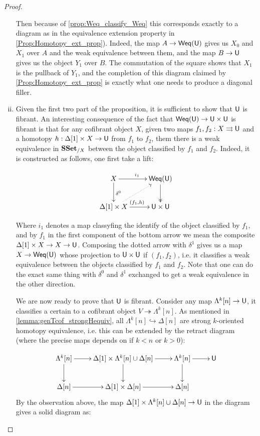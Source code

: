 \documentclass[reqno,10pt,a4paper,oneside,draft]{amsart}
\begin{document}
\begin{proof}
\begin{enumerate}[(i)]
Then because of  \cref{prop:Weq_classify_Weq} this corresponds exactly to a diagram as in the equivalence extension property in \cref{Prop:Homotopy_ext_prop}). Indeed, the map $A \rightarrow  \mathsf{Weq}(\mathsf{U})$ gives us $X_0$ and $X_1$ over $A$ and the weak equivalence between them, and the map $B \rightarrow \mathsf{U}$ gives us the object $Y_1$ over $B$. The commutation of the square shows that $X_1$ is the pullback of $Y_1$, and the completion of this diagram claimed by \cref{Prop:Homotopy_ext_prop} is exactly what one needs to produce a diagonal filler.

\item Given the first two part of the proposition, it is sufficient to show that $\mathsf{U}$ is fibrant. An interesting consequence of the fact that $\mathsf{Weq}(\mathsf{U}) \rightarrow \mathsf{U} \times \mathsf{U}$ is fibrant is that for any cofibrant object $X$, given two maps $f_1,f_2:X \rightrightarrows \mathsf{U}$ and a homotopy $h:\Delta[1] \times X \rightarrow \mathsf{U}$ from $f_1$ to $f_2$, them there is a weak equivalence in $\mathbf{SSet}_{/X}$ between the object classified by $f_1$ and $f_2$. Indeed, it is constructed as follows, one first take a lift:

\[\xymatrix{ X \ar[r]^{i_1} \ar[d]^{\delta^0} & \mathsf{Weq}(\U) \ar@{->>}[d] \\
\Delta[1] \times X \ar[r]^{(f_1,h)} \ar@{.>}[ur] & \U \times \U
}\]

Where $i_1$ denotes a map classyfing the identify of the object classified by $f_1$, and by $f_1$ in the first component of the bottom arrow we mean the composite $\Delta[1] \times X \rightarrow X \rightarrow \mathsf{U}$. Composing the dotted arrow with $\delta^1$ gives us a map $X \rightarrow  \mathsf{Weq}(\mathsf{U})$ whose projection to $\mathsf{U} \times \mathsf{U}$ if $(f_1,f_2)$, i.e. it classifies a weak equivalence between the objects classified by $f_1$ and $f_2$. Note that one can do the exact same thing with $\delta^0$ and $\delta^1$ exchanged to get a weak equivalence in the other direction.


We are now ready to prove that $\mathsf{U}$ is fibrant. Consider any map $\Lambda^k[n] \rightarrow \mathsf{U} $, it classifies a certain to a cofibrant object $V \twoheadrightarrow \Lambda^k[n]$. As mentioned in \cref{lemma:genTcof_strongHequiv}, all $\Lambda^k [n] \hookrightarrow \Delta[n]$ are strong $k$-oriented homotopy equivalence, i.e. this can be extended by the retract diagram (where the precise maps depends on if $k<n$ or $k>0$):

\[\xymatrix{\Lambda^k[n] \ar[d] \ar[r] & \Delta[1] \times \Lambda^k[n] \cup \Delta[n] \ar[d] \ar[r] & \Lambda^k[n] \ar[d] \ar[r] & \U \\
\Delta[n] \ar[r] & \Delta[1] \times \Delta[n] \ar[r] & \Delta[n] 
}\]
By the observation above, the map $\Delta[1] \times \Lambda^k[n] \cup \Delta[n] \rightarrow \mathsf{U}$ in the diagram gives a solid diagram as:


\end{enumerate}
\end{proof}
\end{document}

